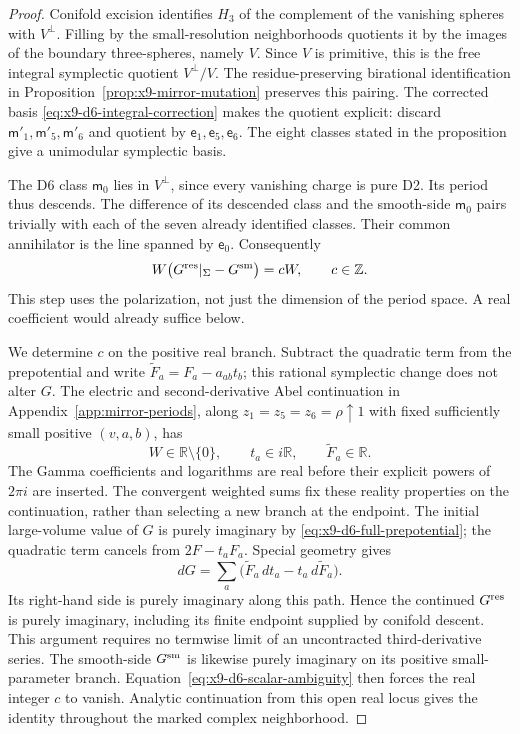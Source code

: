 \begin{proof}
Conifold excision identifies $H_3$ of the complement of the vanishing
spheres with $V^\perp$. Filling by the small-resolution neighborhoods
quotients it by the images of the boundary three-spheres, namely $V$.
Since $V$ is primitive, this is the free integral symplectic quotient
$V^\perp/V$. The residue-preserving birational identification in
Proposition~\ref{prop:x9-mirror-mutation} preserves this pairing.
The corrected basis \eqref{eq:x9-d6-integral-correction} makes the
quotient explicit: discard $\mathsf m'_1,\mathsf m'_5,\mathsf m'_6$ and quotient by
$\mathsf e_1,\mathsf e_5,\mathsf e_6$. The eight classes stated in the proposition give a
unimodular symplectic basis.

The D6 class $\mathsf m_0$ lies in $V^\perp$, since every vanishing charge
is pure D2. Its period thus descends. The difference of its descended
class and the smooth-side $\mathsf m_0$ pairs trivially with each of the seven
already identified classes. Their common annihilator is the line
spanned by $\mathsf e_0$. Consequently
\begin{equation}
 W\bigl(G^{\rm res}|_\Sigma-G^{\rm sm}\bigr)=cW,
 \qquad c\in\mathbb Z.
 \label{eq:x9-d6-scalar-ambiguity}
\end{equation}
This step uses the polarization, not just the dimension of the period
space. A real coefficient would already suffice below.

We determine $c$ on the positive real branch. Subtract the quadratic
term from the prepotential and write
$\widetilde F_a=F_a-a_{ab}t_b$; this rational symplectic change
does not alter $G$. The electric and second-derivative Abel
continuation in Appendix~\ref{app:mirror-periods}, along
$z_1=z_5=z_6=\rho\uparrow1$ with fixed sufficiently small positive
$(v,a,b)$, has
\begin{equation}
 W\in\mathbb R\setminus\{0\},\qquad t_a\in i\mathbb R,\qquad
 \widetilde F_a\in\mathbb R.
 \label{eq:x9-d6-real-continuation}
\end{equation}
The Gamma coefficients and logarithms are real before their explicit
powers of $2\pi i$ are inserted. The convergent weighted sums fix
these reality properties on the continuation, rather than selecting
a new branch at the endpoint. The initial large-volume value of $G$
is purely imaginary by \eqref{eq:x9-d6-full-prepotential}; the
quadratic term cancels from $2F-t_aF_a$. Special geometry gives
\begin{equation}
 dG=\sum_a\bigl(\widetilde F_a\,dt_a-t_a\,d\widetilde F_a\bigr).
 \label{eq:x9-d6-reality-differential}
\end{equation}
Its right-hand side is purely imaginary along this path. Hence the
continued $G^{\rm res}$ is purely imaginary, including its finite
endpoint supplied by conifold descent. This argument requires no
termwise limit of an uncontracted third-derivative series. The
smooth-side $G^{\rm sm}$ is likewise purely imaginary on its
positive small-parameter branch. Equation~\eqref{eq:x9-d6-scalar-ambiguity}
then forces the real integer $c$ to vanish. Analytic continuation
from this open real locus gives the identity throughout the marked
complex neighborhood.


\end{proof}
